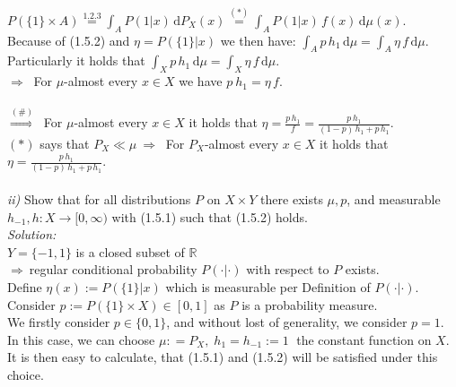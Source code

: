 \documentclass{article}
\begin{document}
\vspace*{-1em} \\
\indent $P(\{ 1\} \times A) \overset{1.2.3}{=} \displaystyle{ \int_{A} P({1}| x)\, \text{d}P_X(x) \overset{(*)}{=} \int_{A} P({1}| x)\, f(x)\, \text{d}\mu(x)  }  $.\vspace*{0.3em}\\
Because of (1.5.2) and $\eta=P(\{ 1\}|x)$ we then have: $\displaystyle{ \int_{A} p\,h_1\, \text{d}\mu =\int_A \eta \, f \, \text{d}\mu  }$.\vspace*{0.1em}\\
Particularly it holds that $\displaystyle{ \int_{X} p\,h_1\, \text{d}\mu =\int_X \eta \, f \, \text{d}\mu  }$.\vspace*{0.7em}\\
$\Rightarrow \ $ For $\mu$-almost every $x\in X$ we have $\displaystyle{ p\ h_1 = \eta \, f } $. \\
\vspace*{-1em} \\
$\overset{(\#)}{\Rightarrow} \ $ For $\mu$-almost every $x\in X$ it holds that $\displaystyle{ \eta = \frac{p\, h_1}{f} = \frac{p \, h_1}{(1-p)\,h_1 + p\, h_1} }$.\\
$(*)$ says that $P_X \ll \mu \ \Rightarrow \ $ For $P_X$-almost every $x\in X$ it holds that $\displaystyle{ \eta = \frac{p \, h_1}{(1-p)\,h_1 + p\, h_1} }$.\\
\\
\textsl{ii)} Show that for all distributions $P$ on $X\times Y$ there exists $\mu, p$, and measurable $h_{-1}, h: X \rightarrow [0,\infty)$ with (1.5.1) such that (1.5.2) holds. \vspace{0.5em}\\
\textsl{Solution:} \\
$Y=\{-1,1\}$ is a closed subset of $\mathbb{R} \ $\\
$\Rightarrow \ $regular conditional probability $P(\cdot | \cdot )$ with respect to $P$ exists.  \\
Define $\eta(x):=P(\{1\}|x)$ which is measurable per Definition of $P(\cdot | \cdot )$. \\
Consider $p:=P(\{1\} \times X) \in [0,1]$ as $P$ is a probability measure. \\
We firstly consider $p \in \{0,1\}$, and without lost of generality, we consider $p = 1$. \\
In this case, we can choose $\mu: = P_X,\; h_1 = h_{-1} := 1 \;$ the constant function on $X$.\\
It is then easy to calculate, that (1.5.1) and (1.5.2) will be satisfied under this choice.\\
\end{document}
